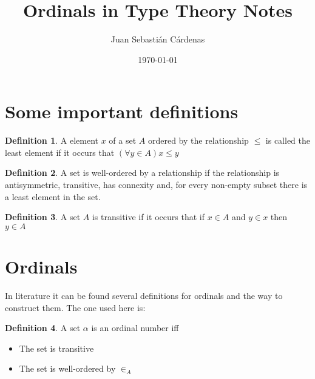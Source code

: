 \documentclass[11pt]{article}
\title{Ordinals in Type Theory Notes}
\author{Juan Sebastián Cárdenas}
\date{\today}
\theoremstyle{definition}
\newtheorem{definition}{Definition}[section]
\begin{document}
\maketitle
\section{Some important definitions}

\begin{definition}
  A element $x$ of a set $A$ ordered by the relationship $\leq$ is called the least element if it occurs that $(\forall y \in A) x \leq y$
\end{definition}

\begin{definition}
  A set is well-ordered by a relationship if the relationship is antisymmetric, transitive, has connexity and, for every non-empty subset there is a least element in the set.
\end{definition}

\begin{definition}
  A set $A$ is transitive if it occurs that if $x \in A$ and $y \in x$ then $y \in A$
\end{definition}

\section{Ordinals}
In literature it can be found several definitions for ordinals and the way to construct them. The one used here is:

\begin{definition}
  A set $\alpha$ is an ordinal number iff
  \begin{itemize}
  \item The set is transitive
  \item The set is well-ordered by $\in_A$  
  \end{itemize}
\end{definition}
\end{document}
